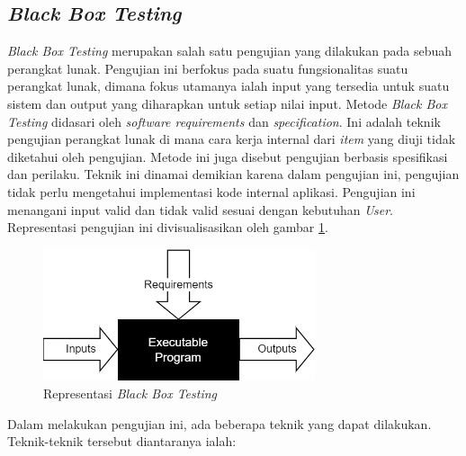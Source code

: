\subsection{\textit{Black Box Testing}}
\textit{Black Box Testing} merupakan salah satu pengujian yang dilakukan pada sebuah perangkat lunak.
Pengujian ini berfokus pada suatu fungsionalitas suatu perangkat lunak, dimana fokus utamanya ialah input yang tersedia untuk suatu sistem dan output yang diharapkan untuk setiap nilai input.
Metode \textit{Black Box Testing} didasari oleh \textit{software requirements} dan \textit{specification}. Ini adalah teknik pengujian perangkat lunak di mana cara kerja internal dari \textit{item} yang diuji tidak diketahui oleh pengujian.
Metode ini juga disebut pengujian berbasis spesifikasi dan perilaku. 
Teknik ini dinamai demikian karena dalam pengujian ini, pengujian tidak perlu mengetahui implementasi kode internal aplikasi\cite{beizer1995black}.
Pengujian ini menangani input valid dan tidak valid sesuai dengan kebutuhan \textit{User}. Representasi pengujian ini divisualisasikan oleh gambar \ref*{Fig:Black Box Testing}.
\begin{figure}[H]
	\centering
	\includegraphics[width=8cm]{contents/chapter-2/images/BlackBox-Testing.png}
	\caption{Representasi \textit{Black Box Testing}\cite{beizer1995black}}
	\label{Fig:Black Box Testing}
\end{figure}
Dalam melakukan pengujian ini, ada beberapa teknik yang dapat dilakukan. Teknik-teknik tersebut diantaranya ialah:
